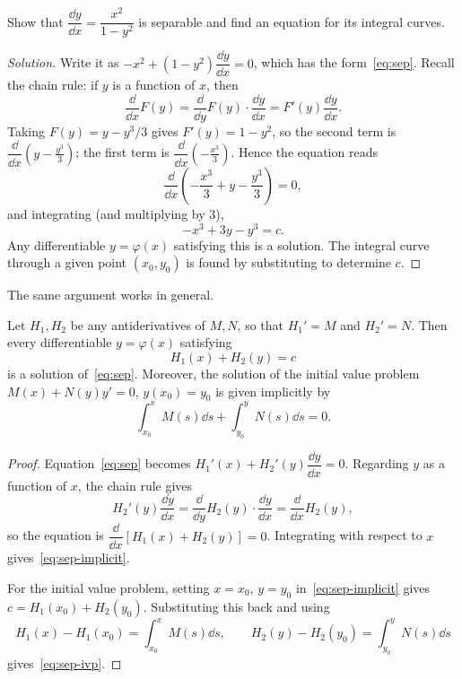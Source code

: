 \begin{eg}
	Show that \(\dfrac{\dd y}{\dd x} = \dfrac{x^2}{1 - y^2}\) is separable and find an
	equation for its integral curves.
\end{eg}

\begin{proof}[Solution]
	Write it as \(-x^2 + (1 - y^2) \dfrac{\dd y}{\dd x} = 0\), which has the
	form~\eqref{eq:sep}. Recall the chain rule: if \(y\) is a function of \(x\), then
	\[
		\frac{\dd}{\dd x} F(y) = \frac{\dd}{\dd y}F(y) \cdot \frac{\dd y}{\dd x}
		= F'(y) \frac{\dd y}{\dd x}.
	\]
	Taking \(F(y) = y - y^3/3\) gives \(F'(y) = 1 - y^2\), so the second term is
	\(\dfrac{\dd}{\dd x}\left( y - \frac{y^3}{3}\right)\); the first term is
	\(\dfrac{\dd}{\dd x}\left( -\frac{x^3}{3} \right)\). Hence the equation reads
	\[
		\frac{\dd}{\dd x}\left( -\frac{x^3}{3} + y - \frac{y^3}{3} \right) = 0,
	\]
	and integrating (and multiplying by \(3\)),
	\[
		-x^3 + 3y - y^3 = c.
	\]
	Any differentiable \(y = \varphi(x)\) satisfying this is a solution. The integral
	curve through a given point \((x_0, y_0)\) is found by substituting to determine
	\(c\).
\end{proof}

The same argument works in general.

\begin{theorem}\label{thm:sep}
	Let \(H_1, H_2\) be any antiderivatives of \(M, N\), so that \(H_1' = M\) and
	\(H_2' = N\). Then every differentiable \(y = \varphi(x)\) satisfying
	\begin{equation}\label{eq:sep-implicit}
		H_1(x) + H_2(y) = c
	\end{equation}
	is a solution of~\eqref{eq:sep}. Moreover, the solution of the initial value problem
	\(M(x) + N(y) y' = 0\), \(y(x_0) = y_0\) is given implicitly by
	\begin{equation}\label{eq:sep-ivp}
		\int_{x_0}^{x} M(s) \dd s + \int_{y_0}^{y} N(s) \dd s = 0.
	\end{equation}
\end{theorem}

\begin{proof}
	Equation~\eqref{eq:sep} becomes \(H_1'(x) + H_2'(y) \dfrac{\dd y}{\dd x} = 0\).
	Regarding \(y\) as a function of \(x\), the chain rule gives
	\[
		H_2'(y) \frac{\dd y}{\dd x}
		= \frac{\dd}{\dd y}H_2(y) \cdot \frac{\dd y}{\dd x}
		= \frac{\dd}{\dd x} H_2(y),
	\]
	so the equation is \(\dfrac{\dd}{\dd x}\left[ H_1(x) + H_2(y) \right] = 0\).
	Integrating with respect to \(x\) gives~\eqref{eq:sep-implicit}.

	For the initial value problem, setting \(x = x_0\), \(y = y_0\)
	in~\eqref{eq:sep-implicit} gives \(c = H_1(x_0) + H_2(y_0)\). Substituting this back
	and using
	\[
		H_1(x) - H_1(x_0) = \int_{x_0}^{x} M(s)\dd s,
		\qquad
		H_2(y) - H_2(y_0) = \int_{y_0}^{y} N(s)\dd s
	\]
	gives~\eqref{eq:sep-ivp}.
\end{proof}

